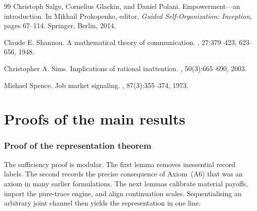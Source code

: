 \documentclass[11pt,a4paper]{article}
\theoremstyle{definition}
\newcommand{\1}{\mathbf 1}
\begin{document}
\begin{thebibliography}{99}
Christoph Salge, Cornelius Glackin, and Daniel Polani.
\newblock Empowerment---an introduction.
\newblock In Mikhail Prokopenko, editor, {\em Guided Self-Organization: Inception}, pages 67--114. Springer, Berlin,
  2014.

Claude E. Shannon.
\newblock A mathematical theory of communication.
, 27:379--423, 623--656, 1948.

Christopher A. Sims.
\newblock Implications of rational inattention.
, 50(3):665--690, 2003.

Michael Spence.
\newblock Job market signaling.
, 87(3):355--374, 1973.

\end{thebibliography}



\clearpage
\appendix

\part*{Proofs of the main results}

\section{Proof of the representation theorem}\label{app:main-proof}
The sufficiency proof is modular.  The first lemma removes inessential record labels.  The second records the precise
consequence of Axiom~\textup{(A6)} that was an axiom in many earlier formulations.  The next lemmas calibrate material
payoffs, import the pure-trace engine, and align continuation scales.  Sequentialising an arbitrary joint channel then
yields the representation in one line.
\end{document}

